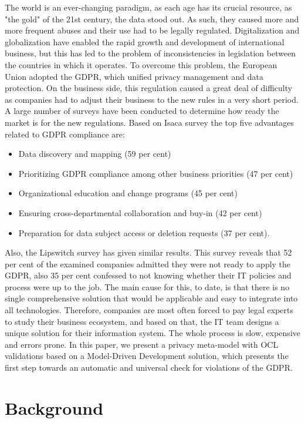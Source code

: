 \documentclass[11pt,english]{article}
\begin{document}
The world is an ever-changing paradigm, as each age has its crucial resource, as "the gold" of the 21st century, the data stood out. As such, they caused more and more frequent abuses and their use had to be legally regulated. Digitalization and globalization have enabled the rapid growth and development of international business, but this has led to the problem of inconsistencies in legislation between the countries in which it operates. To overcome this problem, the European Union adopted the GDPR, which unified privacy management and data protection. On the business side, this regulation caused a great deal of difficulty as companies had to adjust their business to the new rules in a very short period. A large number of surveys have been conducted to determine how ready the market is for the new regulations. Based on Isaca survey \cite{isaca} the top five advantages related to GDPR compliance are:
\begin{itemize}
  \item Data discovery and mapping (59 per cent)
  \item Prioritizing GDPR compliance among other business priorities (47 per cent)
  \item Organizational education and change programs (45 per cent)
  \item Ensuring cross-departmental collaboration and buy-in (42 per cent)
  \item Preparation for data subject access or deletion requests (37 per cent).
\end{itemize}
Also, the Lipswitch survey\cite{lipswitch} has given similar results. This survey reveals that 52 per cent of the examined companies admitted they were not ready to apply the GDPR, also 35 per cent confessed to not knowing whether their IT policies and process were up to the job. The main cause for this, to date, is that there is no single comprehensive solution that would be applicable and easy to integrate into all technologies. Therefore, companies are most often forced to pay legal experts to study their business ecosystem, and based on that, the IT team designs a unique solution for their information system. The whole process is slow, expensive and errors prone.
In this paper, we present a privacy meta-model with OCL validations\cite{ocl} based on a Model-Driven Development solution, which presents the first step towards an automatic and universal check for violations of the GDPR.

\section{Background}

\printbibliography
\end{document}
